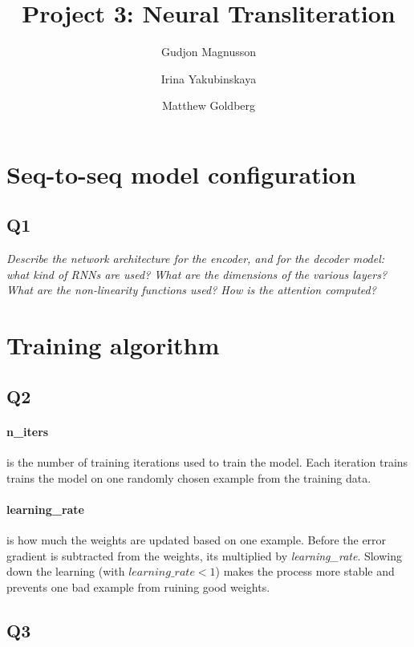 \documentclass[12pt]{article}
\begin{document}
\title{
	Project 3: Neural Transliteration
}
\author{
Gudjon Magnusson 
\and Irina Yakubinskaya 
\and Matthew Goldberg
}

\maketitle


\section{Seq-to-seq model configuration}

\subsection{Q1}
\textit{
Describe the network architecture for the encoder, and for the decoder model: what kind of RNNs are used? What are the dimensions of the various layers? What are the non-linearity functions used? How is the attention computed?
}


\section{Training algorithm}

\subsection{Q2}

\paragraph{n\_iters} is the number of training iterations used to train the model. Each iteration trains trains the model on one randomly chosen example from the training data.

\paragraph{learning\_rate} is how much the weights are updated based on one example. Before the error gradient is subtracted from the weights, its multiplied by \textit{learning\_rate}. Slowing down the learning (with $learning\_rate < 1$) makes the process more stable and prevents one bad example from ruining good weights.


\subsection{Q3}
\end{document}
